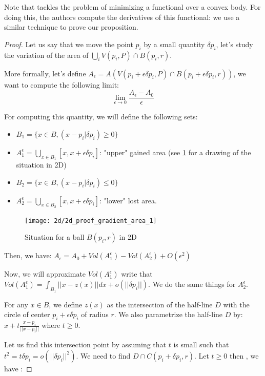 Note that \cite{lachand2005minimizing} tackles the problem of minimizing a
functional over a convex body. For doing this, the authors compute the
derivatives of this functional: we use a similar technique to prove our
proposition.

\begin{proof}

Let us say that we move the point $ p _i $ by a small quantity $ \delta p_i $,
let's study the variation of the area of $ \bigcup_i V(p_i, P) \cap B(p_i, r) $.

More formally, let's define $ A_{\epsilon} = A(V(p_i + \epsilon \delta p_i, P) \cap
B(p_i + \epsilon \delta p_i, r)) $, we want to compute the following limit:
$$ \lim\limits_{\epsilon \to 0} \frac{A_{\epsilon} - A_0}{\epsilon} $$

For computing this quantity, we will define the following sets:
\begin{itemize}
    \item $ B_1 = \{ x \in B, (x - p_i | \delta p_i) \geq 0\} $
    \item $ A_1^{\epsilon} = \bigcup_{x \in B_1} [x, x + \epsilon \delta p_i] $:
        "upper" gained area (see \ref{fig:demo-gradient} for a drawing of the
        situation in 2D)
    \item $ B_2 = \{ x \in B, (x - p_i | \delta p_i) \leq 0\} $
    \item $ A_2^{\epsilon} = \bigcup_{x \in B_2} [x, x + \epsilon \delta p_i] $:
        "lower" lost area.
\end{itemize}

\begin{figure}[h]
    \centering
    \texttt{[image: 2d/2d\_proof\_gradient\_area\_1]}
    \caption{Situation for a ball $ B(p_i, r) $ in 2D}
    \label{fig:demo-gradient}
\end{figure}

Then, we have: $ A_\epsilon = A_0 + Vol(A_1^\epsilon) - Vol(A_2^\epsilon) +
O(\epsilon^2) $

Now, we will approximate $ Vol(A_1^\epsilon) $ write that $ Vol(A_1^\epsilon) =
\int_{B_1} || x - z(x) || dx + o(||\delta p_i||) $. We do the same things for $
A_2^\epsilon $.

For any $ x \in B $, we define $ z(x) $ as the intersection of the half-line $ D
$ with the circle of center $ p_i + \epsilon \delta p_i $ of radius $ r $. We
also parametrize the half-line $ D $ by: $ x + t \frac{x - p_i}{||x - p_i||} $
where $ t \ge 0 $.

Let us find this intersection point by assuming that $ t $ is small such that $
t^2 = t \delta p_i = o(||\delta p_i||^2) $. We need to find $ D \cap C(p_i +
\delta p_i, r) $. Let $ t \ge 0 $ then , we have :


\end{proof}
